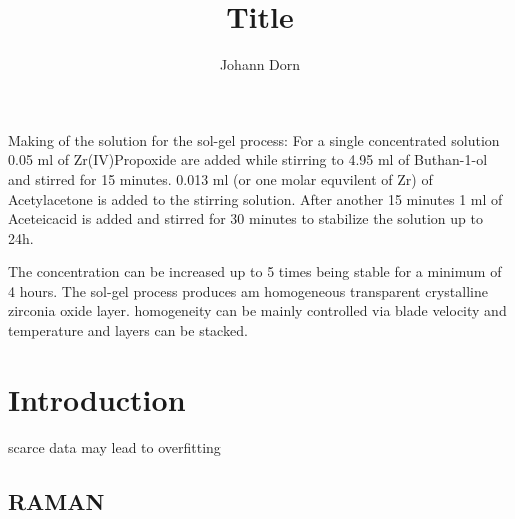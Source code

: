 \documentclass[a4paper]{article}
\title{Title}
\author{Johann Dorn}
\begin{document}
\maketitle
\iffalse
my notes
\fi

Making of the solution for the sol-gel process:
For a single concentrated solution 0.05 ml of Zr(IV)Propoxide are added while stirring to 4.95 ml of Buthan-1-ol and stirred for 15 minutes. 
0.013 ml (or one molar equvilent of Zr) of Acetylacetone is added to the stirring solution. After another 15 minutes 1 ml of Aceteicacid is added and stirred for 30 minutes to stabilize the solution up to 24h. 

The concentration can be increased up to 5 times being stable for a minimum of 4 hours. The sol-gel process produces am homogeneous transparent crystalline zirconia oxide layer. homogeneity can be mainly controlled via blade velocity and temperature and layers can be stacked.

\section{Introduction}
scarce data may lead to overfitting\cite{Lecun1995conv}
\subsection{RAMAN}
\clearpage
\end{document}
